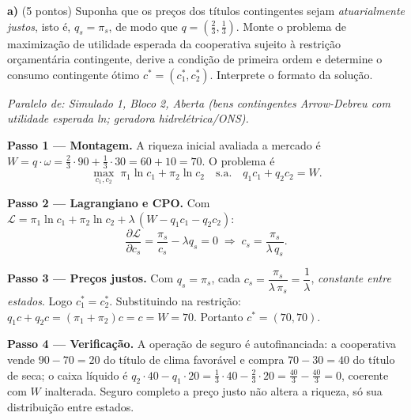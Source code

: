 \textbf{a)} (5 pontos) Suponha que os preços dos títulos contingentes sejam \emph{atuarialmente justos}, isto é, $q_s=\pi_s$, de modo que $q=\left(\tfrac23,\tfrac13\right)$. Monte o problema de maximização de utilidade esperada da cooperativa sujeito à restrição orçamentária contingente, derive a condição de primeira ordem e determine o consumo contingente ótimo $c^{*}=(c_1^{*},c_2^{*})$. Interprete o formato da solução.
\resolucaobox{7.2cm}
\begin{solucao}
{\footnotesize\textit{Paralelo de: Simulado 1, Bloco 2, Aberta (bens contingentes Arrow-Debreu com utilidade esperada ln; geradora hidrelétrica/ONS).}}\par\vspace{0.2em}
\textbf{Passo 1 --- Montagem.} A riqueza inicial avaliada a mercado é $W=q\cdot\omega=\tfrac23\cdot 90+\tfrac13\cdot 30=60+10=70$. O problema é
\[ \max_{c_1,c_2}\;\pi_1\ln c_1+\pi_2\ln c_2\quad\text{s.a.}\quad q_1 c_1+q_2 c_2=W. \]

\textbf{Passo 2 --- Lagrangiano e CPO.} Com $\mathcal{L}=\pi_1\ln c_1+\pi_2\ln c_2+\lambda\,(W-q_1 c_1-q_2 c_2)$:
\[ \frac{\partial\mathcal{L}}{\partial c_s}=\frac{\pi_s}{c_s}-\lambda q_s=0\;\Longrightarrow\; c_s=\frac{\pi_s}{\lambda\,q_s}. \]

\textbf{Passo 3 --- Preços justos.} Com $q_s=\pi_s$, cada $c_s=\dfrac{\pi_s}{\lambda\,\pi_s}=\dfrac{1}{\lambda}$, \emph{constante entre estados}. Logo $c_1^{*}=c_2^{*}$. Substituindo na restrição: $q_1 c+q_2 c=(\pi_1+\pi_2)c=c=W=70$. Portanto $c^{*}=(70,70)$.

\textbf{Passo 4 --- Verificação.} A operação de seguro é autofinanciada: a cooperativa vende $90-70=20$ do título de clima favorável e compra $70-30=40$ do título de seca; o caixa líquido é $q_2\cdot 40-q_1\cdot 20=\tfrac13\cdot 40-\tfrac23\cdot 20=\tfrac{40}{3}-\tfrac{40}{3}=0$, coerente com $W$ inalterada. Seguro completo a preço justo não altera a riqueza, só sua distribuição entre estados.


\end{solucao}
